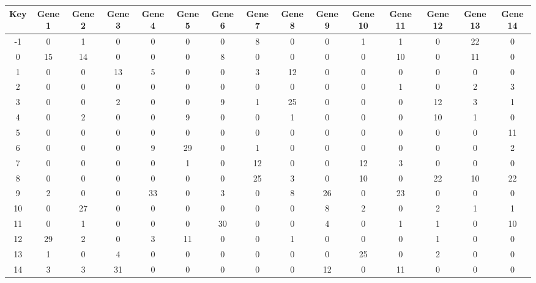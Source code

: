 \begin{tabular}{|c|c|c|c|c|c|c|c|c|c|c|c|c|c|c|}
\hline
Key & Gene 1 & Gene 2 & Gene 3 & Gene 4 & Gene 5 & Gene 6 & Gene 7 & Gene 8 & Gene 9 & Gene 10 & Gene 11 & Gene 12 & Gene 13 & Gene 14 \\
\hline
-1 & 0 & 1 & 0 & 0 & 0 & 0 & 8 & 0 & 0 & 1 & 1 & 0 & 22 & 0 \\
0 & 15 & 14 & 0 & 0 & 0 & 8 & 0 & 0 & 0 & 0 & 10 & 0 & 11 & 0 \\
1 & 0 & 0 & 13 & 5 & 0 & 0 & 3 & 12 & 0 & 0 & 0 & 0 & 0 & 0 \\
2 & 0 & 0 & 0 & 0 & 0 & 0 & 0 & 0 & 0 & 0 & 1 & 0 & 2 & 3 \\
3 & 0 & 0 & 2 & 0 & 0 & 9 & 1 & 25 & 0 & 0 & 0 & 12 & 3 & 1 \\
4 & 0 & 2 & 0 & 0 & 9 & 0 & 0 & 1 & 0 & 0 & 0 & 10 & 1 & 0 \\
5 & 0 & 0 & 0 & 0 & 0 & 0 & 0 & 0 & 0 & 0 & 0 & 0 & 0 & 11 \\
6 & 0 & 0 & 0 & 9 & 29 & 0 & 1 & 0 & 0 & 0 & 0 & 0 & 0 & 2 \\
7 & 0 & 0 & 0 & 0 & 1 & 0 & 12 & 0 & 0 & 12 & 3 & 0 & 0 & 0 \\
8 & 0 & 0 & 0 & 0 & 0 & 0 & 25 & 3 & 0 & 10 & 0 & 22 & 10 & 22 \\
9 & 2 & 0 & 0 & 33 & 0 & 3 & 0 & 8 & 26 & 0 & 23 & 0 & 0 & 0 \\
10 & 0 & 27 & 0 & 0 & 0 & 0 & 0 & 0 & 8 & 2 & 0 & 2 & 1 & 1 \\
11 & 0 & 1 & 0 & 0 & 0 & 30 & 0 & 0 & 4 & 0 & 1 & 1 & 0 & 10 \\
12 & 29 & 2 & 0 & 3 & 11 & 0 & 0 & 1 & 0 & 0 & 0 & 1 & 0 & 0 \\
13 & 1 & 0 & 4 & 0 & 0 & 0 & 0 & 0 & 0 & 25 & 0 & 2 & 0 & 0 \\
14 & 3 & 3 & 31 & 0 & 0 & 0 & 0 & 0 & 12 & 0 & 11 & 0 & 0 & 0 \\
\hline
\end{tabular}